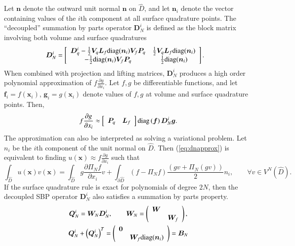 \documentclass[preprint,10pt]{elsarticle}
\theoremstyle{definition}
\theoremstyle{lemma}
\theoremstyle{corollary}
\theoremstyle{theorem}
\theoremstyle{assumption}
\renewcommand{\hat}[1]{\widehat{#1}}
\newcommand{\pd}[2]{\frac{\partial#1}{\partial#2}}
\newcommand{\LRp}[1]{\left( #1 \right)}
\newcommand{\LRs}[1]{\left[ #1 \right]}
\begin{document}
Let $\bm{n}$ denote the outward unit normal $\bm{n}$ on $\hat{D}$, and let $\bm{n}_i$ denote the vector containing values of the $i$th component at all surface quadrature points.  The ``decoupled'' summation by parts operator $\bm{D}^i_N$ is defined as the block matrix involving both volume and surface quadratures
\begin{align}
\bm{D}^i_N  &= \LRs{
\begin{array}{cc}
\bm{D}^i_q - \frac{1}{2}\bm{V}_q \bm{L}_f {\rm diag}({\bm{n}}_i) \bm{V}_f\bm{P}_q &  \frac{1}{2}\bm{V}_q\bm{L}_f{\rm diag}({\bm{n}}_i)\\
-\frac{1}{2}{\rm diag}({\bm{n}}_i)\bm{V}_f\bm{P}_q & \frac{1}{2}{\rm diag}({\bm{n}}_i)
\end{array}}.  
\label{eq:DN}
\end{align}
When combined with projection and lifting matrices, $\bm{D}^i_N$ produces a high order polynomial approximation of $f\pd{g}{x_i}$. 
Let $f, g$ be differentiable functions, and let $\bm{f}_i = f(\bm{x}_i)$, $\bm{g}_i = g(\bm{x}_i)$ denote values of $f,g$ at volume and surface quadrature points.  Then,
\begin{gather}
f\pd{g}{x_i} \approx \LRs{\begin{array}{cc}
\bm{P}_q & \bm{L}_f\end{array}} {\rm diag}\LRp{\bm{f}}\bm{D}^i_N \bm{g}.  
\label{eq:dnapprox}
\end{gather}
The approximation can also be interpreted as solving a variational problem.  Let $n_i$ be the $i$th component of the unit normal on $\hat{D}$.  Then (\ref{eq:dnapprox}) is equivalent to finding $u(\bm{x}) \approx f\pd{g}{x_i}$ such that 
\[
\int_{\hat{D}} u(\bm{x})v(\bm{x})  = \int_{\hat{D}}{g\pd{\Pi_Nf}{x_i}v} + \int_{\partial \hat{D}}{(f-\Pi_Nf)\frac{\LRp{gv + \Pi_N(gv)}}{2}}n_i, \qquad \forall v\in V^N\LRp{\hat{D}}.
\]
If the surface quadrature rule is exact for polynomials of degree $2N$, then the decoupled SBP operator $\bm{D}^i_N$ also satisfies a summation by parts property.  
\begin{gather}
\bm{Q}^i_N = \bm{W}_N \bm{D}^i_N, \qquad \bm{W}_N = \LRp{\begin{array}{cc}\bm{W}&\\ & \bm{W}_f\end{array}},\label{eq:dsbp}\\ \bm{Q}^i_N+\LRp{\bm{Q}^i_N}^T = \LRp{\begin{array}{cc}\bm{0}&\\ & \bm{W}_f {\rm diag}(\bm{n}_i)\end{array}} = \bm{B}_N\nonumber
\end{gather}
\end{document}
